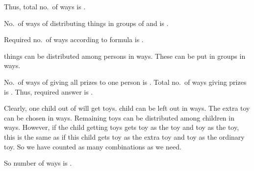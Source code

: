   Thus, total no.\ of ways is .
\item No.\ of ways of distributing  things in groups of  and  is .
\item Required no.\ of ways according to formula is .
\item {} things can be distributed among  persons in  ways. These can be
  put in  groups in  ways.
\item No.\ of ways of giving all prizes to one person is . Total no.\ of ways giving prizes is
  . Thus, required answer is .
\item Clearly, one child out of  will get  toys.  child can be left out in 
  ways. The extra toy can be chosen in  ways. Remaining  toys can be distributed among  children in  ways. However, if the child getting  toys gets toy  as the
   toy and toy  as the  toy, this is the same as if this child gets toy
   as the extra toy and toy  as the ordinary toy. So we have counted  as many combinations
  as we need.

  So number of ways is .
\stopitemize
